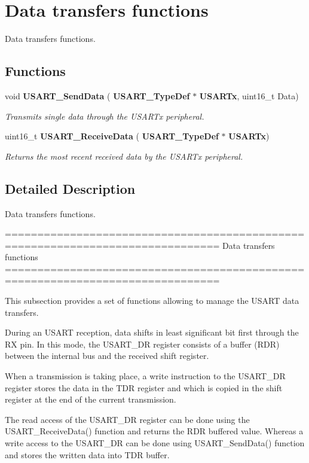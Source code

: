 \section{Data transfers functions}
\label{group__USART__Group2}


Data transfers functions.  


\subsection*{Functions}
\begin{DoxyCompactItemize}
\item 
void \textbf{ U\+S\+A\+R\+T\+\_\+\+Send\+Data} (\textbf{ U\+S\+A\+R\+T\+\_\+\+Type\+Def} $\ast$\textbf{ U\+S\+A\+R\+Tx}, uint16\+\_\+t Data)
\begin{DoxyCompactList}\small\item\em Transmits single data through the U\+S\+A\+R\+Tx peripheral. \end{DoxyCompactList}\item 
uint16\+\_\+t \textbf{ U\+S\+A\+R\+T\+\_\+\+Receive\+Data} (\textbf{ U\+S\+A\+R\+T\+\_\+\+Type\+Def} $\ast$\textbf{ U\+S\+A\+R\+Tx})
\begin{DoxyCompactList}\small\item\em Returns the most recent received data by the U\+S\+A\+R\+Tx peripheral. \end{DoxyCompactList}\end{DoxyCompactItemize}


\subsection{Detailed Description}
Data transfers functions. 

\begin{DoxyVerb} ===============================================================================
                            Data transfers functions
 ===============================================================================  

  This subsection provides a set of functions allowing to manage the USART data 
  transfers.
  
  During an USART reception, data shifts in least significant bit first through 
  the RX pin. In this mode, the USART_DR register consists of a buffer (RDR) 
  between the internal bus and the received shift register.

  When a transmission is taking place, a write instruction to the USART_DR register 
  stores the data in the TDR register and which is copied in the shift register 
  at the end of the current transmission.

  The read access of the USART_DR register can be done using the USART_ReceiveData()
  function and returns the RDR buffered value. Whereas a write access to the USART_DR 
  can be done using USART_SendData() function and stores the written data into 
  TDR buffer.\end{DoxyVerb}
 

